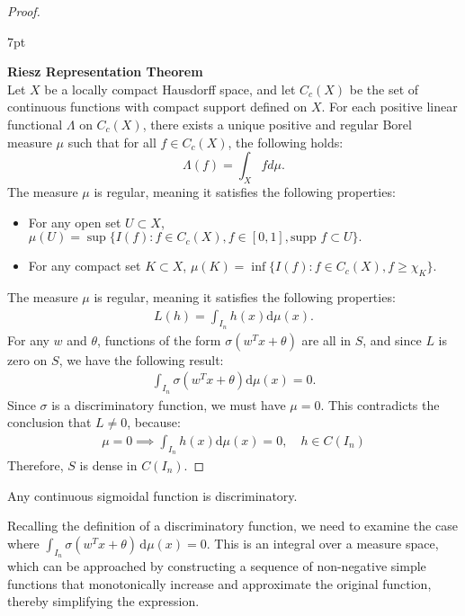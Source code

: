 \documentclass[12pt]{article}
\newenvironment{formal}{%
\def\FrameCommand{%
\hspace{1pt}%
{\color{Blue}\vrule width 2pt}%
{\color{formalshade}\vrule width 4pt}%
\colorbox{formalshade}%
}%
\MakeFramed{\advance\hsize-\width\FrameRestore}%
\noindent\hspace{-4.55pt}%
\begin{adjustwidth}{}{7pt}%
\vspace{2pt}\vspace{2pt}%
}
{%
\vspace{2pt}\end{adjustwidth}\endMakeFramed%
}
\begin{document}
\begin{proof}
\begin{formal}
\textbf{Riesz Representation Theorem}\\
Let $X$ be a locally compact Hausdorff space, and let $C_c(X)$ be the set of continuous functions with compact support defined on $X$. For each positive linear functional $\Lambda$ on $C_c(X)$, there exists a unique positive and regular Borel measure $\mu$ such that for all $f \in C_c(X)$, the following holds:
$$\Lambda(f) = \int_X f d\mu.$$
The measure $\mu$ is regular, meaning it satisfies the following properties:
\begin{itemize}
    \item For any open set \( U \subset X \),
    $
    \mu(U) = \sup \{ I(f) : f \in C_c(X), f \in [0,1], \text{supp } f \subset U \}.
    $
    \item For any compact set \( K \subset X \),
    $
    \mu(K) = \inf \{ I(f) : f \in C_c(X), f \geq \chi_K \}.
    $
\end{itemize}
\end{formal}
The measure $\mu$ is regular, meaning it satisfies the following properties:
\begin{align*}
    L(h)=\int_{I_n} h(x)\mathrm{d}\mu(x).
\end{align*}
For any $w$ and $\theta$, functions of the form $\sigma(w^T x + \theta)$ are all in $S$, and since $L$ is zero on $S$, we have the following result:
\begin{align*}
    \int_{I_n} \sigma(w^Tx+\theta)\mathrm{d}\mu(x)=0.
\end{align*}
Since $\sigma$ is a discriminatory function, we must have $\mu = 0$. This contradicts the conclusion that $L \neq 0$, because:
\begin{align*}
    \mu=0 \implies \int_{I_n} h(x)\mathrm{d}\mu(x)=0,\quad h\in C(I_n)
\end{align*}
Therefore, $S$ is dense in $C(I_n)$. 
\end{proof}

\begin{mylemma}
    Any continuous sigmoidal function is discriminatory.
\end{mylemma}
Recalling the definition of a discriminatory function, we need to examine the case where $\int_{I_n} \sigma(w^T x + \theta) \, \mathrm{d}\mu(x) = 0$. This is an integral over a measure space, which can be approached by constructing a sequence of non-negative simple functions that monotonically increase and approximate the original function, thereby simplifying the expression.
\end{document}
